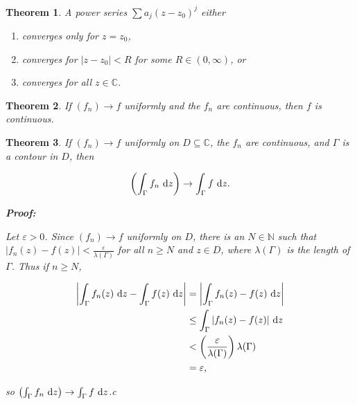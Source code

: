 \documentclass{article}
\theoremstyle{colontheorem}
\newtheorem{theorem}{Theorem}[section]
\newenvironment{Theorem}
{
	\begin{mdframed}[backgroundcolor=TheoremOrange!10]
	\begin{theorem}
}
{
	\end{theorem}
	\end{mdframed}
	
	\vspace{.15in}
}
\newenvironment{Proof}
{
	\begin{mdframed}[backgroundcolor=ProofPurple!10]
	\textbf{Proof:}%
}
{
	\end{mdframed}
	
	\vspace{.085in}
}
\begin{document}
\begin{Theorem}
	
	A power series $\sum a_j (z - z_0)^j$ either
	
	\begin{enumerate}
		
		\item converges only for $z = z_0$,
		
		\item converges for $|z - z_0| < R$ for some $R \in (0, \infty)$, or
		
		\item converges for all $z \in \mathbb{C}$.
		
	\end{enumerate}
	
\end{Theorem}



\begin{Theorem}
	
	If $(f_n) \to f$ uniformly and the $f_n$ are continuous, then $f$ is continuous.
	
\end{Theorem}



\begin{Theorem}
	
	If $(f_n) \to f$ uniformly on $D \subseteq \mathbb{C}$, the $f_n$ are continuous, and $\Gamma$ is a contour in $D$, then
	
	$$
		\left( \int_{\Gamma} f_n\ \textnormal{d}z \right) \to \int_{\Gamma} f\ \textnormal{d}z.
	$$
	
	\begin{Proof}
		Let $\varepsilon > 0$. Since $(f_n) \to f$ uniformly on $D$, there is an $N \in \mathbb{N}$ such that $|f_n(z) - f(z)| < \frac{\varepsilon}{\lambda(\Gamma)}$ for all $n \geq N$ and $z \in D$, where $\lambda(\Gamma)$ is the length of $\Gamma$. Thus if $n \geq N$,
		
		\begin{align*}
			\left| \int_{\Gamma} f_n(z)\ \textnormal{d}z - \int_{\Gamma} f(z)\ \textnormal{d}z \right| &= \left| \int_{\Gamma} f_n(z) - f(z)\ \textnormal{d}z \right|\\
			& \leq \int_{\Gamma} |f_n(z) - f(z)|\ \textnormal{d}z\\
			& < \left( \frac{\varepsilon}{\lambda(\Gamma)} \right) \lambda(\Gamma)\\
			& = \varepsilon\textnormal{,}
		\end{align*}
		
		so $\left( \int_{\Gamma} f_n\ \textnormal{d}z \right) \to \int_{\Gamma} f\ \textnormal{d}z$.c
		
	\end{Proof}
	
\end{Theorem}
\end{document}
